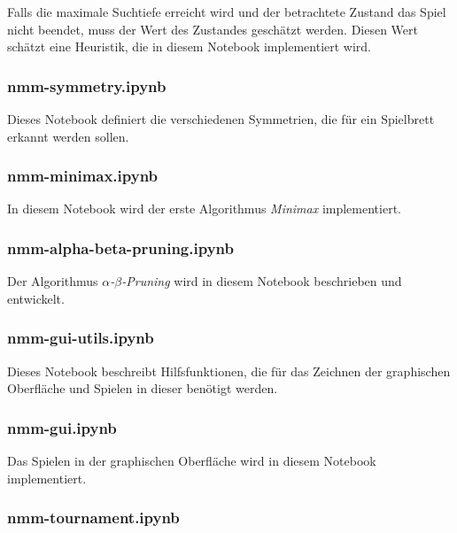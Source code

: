 \documentclass[11pt]{article}
\begin{document}
Falls die maximale Suchtiefe erreicht wird und der betrachtete Zustand
das Spiel nicht beendet, muss der Wert des Zustandes geschätzt werden.
Diesen Wert schätzt eine Heuristik, die in diesem Notebook implementiert
wird.

\hypertarget{nmm-symmetry.ipynb}{%
\subsubsection{nmm-symmetry.ipynb}\label{nmm-symmetry.ipynb}}

Dieses Notebook definiert die verschiedenen Symmetrien, die für ein
Spielbrett erkannt werden sollen.

\hypertarget{nmm-minimax.ipynb}{%
\subsubsection{nmm-minimax.ipynb}\label{nmm-minimax.ipynb}}

In diesem Notebook wird der erste Algorithmus \emph{Minimax}
implementiert.

\hypertarget{nmm-alpha-beta-pruning.ipynb}{%
\subsubsection{nmm-alpha-beta-pruning.ipynb}\label{nmm-alpha-beta-pruning.ipynb}}

Der Algorithmus \emph{$\alpha$-$\beta$-Pruning} wird in diesem Notebook beschrieben
und entwickelt.

\hypertarget{nmm-gui-utils.ipynb}{%
\subsubsection{nmm-gui-utils.ipynb}\label{nmm-gui-utils.ipynb}}

Dieses Notebook beschreibt Hilfsfunktionen, die für das Zeichnen der
graphischen Oberfläche und Spielen in dieser benötigt werden.

\hypertarget{nmm-gui.ipynb}{%
\subsubsection{nmm-gui.ipynb}\label{nmm-gui.ipynb}}

Das Spielen in der graphischen Oberfläche wird in diesem Notebook
implementiert.

\hypertarget{nmm-tournament.ipynb}{%
\subsubsection{nmm-tournament.ipynb}\label{nmm-tournament.ipynb}}
\end{document}
